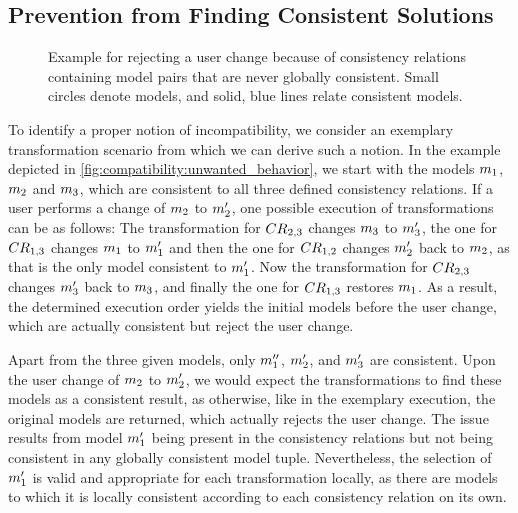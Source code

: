 \subsection{Prevention from Finding Consistent Solutions}
\label{chap:compatibility:informal:prevention}

\begin{figure}
    \centering
    
    \caption[Example for the unwanted rejection of a user change]{Example for rejecting a user change because of consistency relations containing model pairs that are never globally consistent. Small circles denote models, and solid, blue lines relate consistent models.}
    \label{fig:compatibility:unwanted_behavior}
\end{figure}

To identify a proper notion of incompatibility, we consider an exemplary transformation scenario from which we can derive such a notion.
In the example depicted in \autoref{fig:compatibility:unwanted_behavior}, we start with the models $\model{m}{1}$, $\model{m}{2}$ and $\model{m}{3}$, which are consistent to all three defined consistency relations.
If a user performs a change of $\model{m}{2}$ to $\model{m}{2}'$, one possible execution of transformations can be as follows:
The transformation for $\consistencyrelation{CR}{2,3}$ changes $\model{m}{3}$ to $\model{m}{3}'$, the one for $\consistencyrelation{CR}{1,3}$ changes $\model{m}{1}$ to $\model{m}{1}'$ and then the one for $\consistencyrelation{CR}{1,2}$ changes $\model{m}{2}'$ back to $\model{m}{2}$, as that is the only model consistent to $\model{m}{1}'$.
Now the transformation for $\consistencyrelation{CR}{2,3}$ changes $\model{m}{3}'$ back to $\model{m}{3}$, and finally the one for $\consistencyrelation{CR}{1,3}$ restores $\model{m}{1}$.
As a result, the determined execution order yields the initial models before the user change, which are actually consistent but reject the user change.

Apart from the three given models, only $\model{m}{1}''$, $\model{m}{2}'$, and $\model{m}{3}'$ are consistent.
Upon the user change of $\model{m}{2}$ to $\model{m}{2}'$, we would expect the transformations to find these models as a consistent result, as otherwise, like in the exemplary execution, the original models are returned, which actually rejects the user change.
The issue results from model $\model{m}{1}'$ being present in the consistency relations but not being consistent in any globally consistent model tuple.
Nevertheless, the selection of $\model{m}{1}'$ is valid and appropriate for each transformation locally, as there are models to which it is locally consistent according to each consistency relation on its own.

